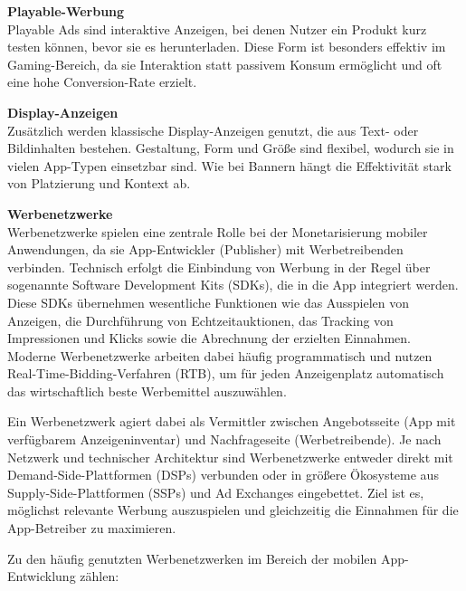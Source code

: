 \textbf{Playable-Werbung}\\
Playable Ads sind interaktive Anzeigen, bei denen Nutzer ein Produkt kurz testen können, bevor sie es herunterladen. Diese Form ist besonders effektiv im Gaming-Bereich, da sie Interaktion statt passivem Konsum ermöglicht und oft eine hohe Conversion-Rate erzielt.\cite{Werbung_HubSpot}\cite{Werbung_knuguru}

\textbf{Display-Anzeigen}\\
Zusätzlich werden klassische Display-Anzeigen genutzt, die aus Text- oder Bildinhalten bestehen. Gestaltung, Form und Größe sind flexibel, wodurch sie in vielen App-Typen einsetzbar sind. Wie bei Bannern hängt die Effektivität stark von Platzierung und Kontext ab.\cite{Werbung_HubSpot}\cite{Werbung_knuguru}

\vspace{0.5em}
\textbf{Werbenetzwerke}\\
Werbenetzwerke spielen eine zentrale Rolle bei der Monetarisierung mobiler Anwendungen, da sie App-Entwickler (Publisher) mit Werbetreibenden verbinden. Technisch erfolgt die Einbindung von Werbung in der Regel über sogenannte Software Development Kits (SDKs), die in die App integriert werden. Diese SDKs übernehmen wesentliche Funktionen wie das Ausspielen von Anzeigen, die Durchführung von Echtzeitauktionen, das Tracking von Impressionen und Klicks sowie die Abrechnung der erzielten Einnahmen. Moderne Werbenetzwerke arbeiten dabei häufig programmatisch und nutzen Real-Time-Bidding-Verfahren (RTB), um für jeden Anzeigenplatz automatisch das wirtschaftlich beste Werbemittel auszuwählen.\cite{Mobile_add_networks}

Ein Werbenetzwerk agiert dabei als Vermittler zwischen Angebotsseite (App mit verfügbarem Anzeigeninventar) und Nachfrageseite (Werbetreibende). Je nach Netzwerk und technischer Architektur sind Werbenetzwerke entweder direkt mit Demand-Side-Plattformen (DSPs) verbunden oder in größere Ökosysteme aus Supply-Side-Plattformen (SSPs) und Ad Exchanges eingebettet. Ziel ist es, möglichst relevante Werbung auszuspielen und gleichzeitig die Einnahmen für die App-Betreiber zu maximieren.\cite{Mobile_add_networks}

Zu den häufig genutzten Werbenetzwerken im Bereich der mobilen App-Entwicklung zählen:

